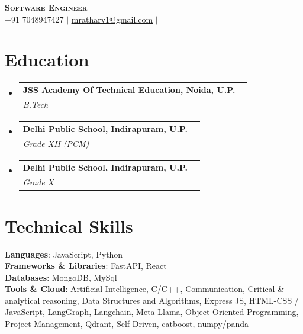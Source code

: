 \documentclass[letterpaper,10pt]{article}
\makeatletter
\newcommand{\resumeSubheading}[4]{
  \vspace{-2pt}\item
    \begin{tabular*}{0.97\textwidth}[t]{l@{\extracolsep{\fill}}r}
      \textbf{#1} & #2 \\
      \textit{\small#3} & \textit{\small #4} \\
    \end{tabular*}\vspace{-7pt}
}
\newcommand{\resumeSubHeadingListStart}{\begin{itemize}[leftmargin=0.15in, label={}]}
\newcommand{\resumeSubHeadingListEnd}{\end{itemize}}
\makeatother
\begin{document}
\begin{center}
    \textbf{\Huge \scshape Software Engineer} \\ \vspace{2pt}
    \small 
    +91 7048947427 $|$     \href{mailto:mratharv1@gmail.com}{\underline{mratharv1@gmail.com}} $|$             \end{center}


\section{Education}
  \resumeSubHeadingListStart
          \resumeSubheading
        {JSS Academy Of Technical Education, Noida, U.P.}{}
        {B.Tech}{}
          \resumeSubheading
        {Delhi Public School, Indirapuram, U.P.}{}
        {Grade XII (PCM)}{}
          \resumeSubheading
        {Delhi Public School, Indirapuram, U.P.}{}
        {Grade X}{}
      \resumeSubHeadingListEnd

\section{Technical Skills}
 \begin{itemize}[leftmargin=0.15in, label={}]
    \small{\item{
                        \textbf{Languages}: JavaScript, Python \\
                                \textbf{Frameworks & Libraries}: FastAPI, React \\
                                \textbf{Databases}: MongoDB, MySql \\
                                \textbf{Tools & Cloud}: Artificial Intelligence, C/C++, Communication, Critical \& analytical reasoning, Data Structures and Algorithms, Express JS, HTML-CSS / JavaScript, LangGraph, Langchain, Meta Llama, Object-Oriented Programming, Project Management, Qdrant, Self Driven, catboost, numpy/panda \\
                                }}
 \end{itemize}

\end{document}
